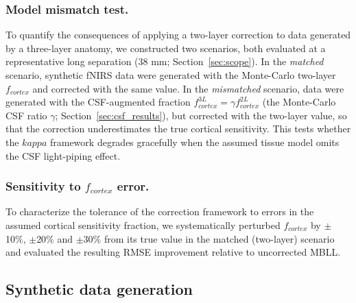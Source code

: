 \documentclass[11pt]{article}
\def\kappa{kappa}%
\def\mathrm#1{#1}%
\def\,{ }%
\begin{document}
\subsubsection{Model mismatch test.}
To quantify the consequences of applying a two-layer correction to data generated by a three-layer anatomy, we constructed two scenarios, both evaluated at a representative long separation (38\,mm; Section~\ref{sec:scope}). In the \textit{matched} scenario, synthetic fNIRS data were generated with the Monte-Carlo two-layer $f_{\mathrm{cortex}}$ and corrected with the same value. In the \textit{mismatched} scenario, data were generated with the CSF-augmented fraction $f_{\mathrm{cortex}}^{\mathrm{3L}} = \gamma\,f_{\mathrm{cortex}}^{\mathrm{2L}}$ (the Monte-Carlo CSF ratio $\gamma$; Section~\ref{sec:csf_results}), but corrected with the two-layer value, so that the correction underestimates the true cortical sensitivity. This tests whether the $\kappa$ framework degrades gracefully when the assumed tissue model omits the CSF light-piping effect.

\subsubsection{Sensitivity to \texorpdfstring{$f_{\mathrm{cortex}}$}{f\_cortex} error.}
To characterize the tolerance of the correction framework to errors in the assumed cortical sensitivity fraction, we systematically perturbed $f_{\mathrm{cortex}}$ by $\pm$10\%, $\pm$20\% and $\pm$30\% from its true value in the matched (two-layer) scenario and evaluated the resulting RMSE improvement relative to uncorrected MBLL.

\subsection{Synthetic data generation}
\end{document}

